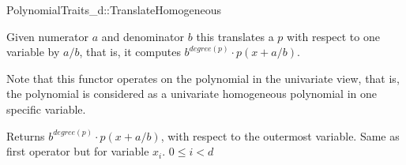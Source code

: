 \begin{ccRefConcept}{PolynomialTraits_d::TranslateHomogeneous}
\ccDefinition

Given numerator $a$ and denominator $b$ this  translates a 
 $p$ with respect to one variable by $a/b$, 
that is, it computes $b^{degree(p)}\cdot p(x+a/b)$. 

Note that this functor operates on the polynomial in the univariate view, that is, 
the polynomial is considered as a univariate homogeneous polynomial in one specific variable. 


\ccRefines 
{}

\ccTypes

\ccGlue

\ccOperations
{}
         { Returns $b^{degree(p)}\cdot p(x+a/b)$, 
        with respect to the outermost variable. }
         { Same as first operator but for variable $x_i$.
           \ccPrecond $0 \leq i  < d$ 
         }


\ccSeeAlso

\\
\\

\end{ccRefConcept}
